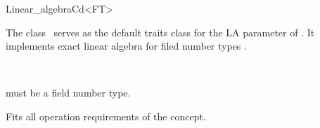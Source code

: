 \ccAutoIndexingOff
\begin{ccRefClass}{Linear_algebraCd<FT>}
\ccAutoIndexingOn
{}

\ccDefinition

The class \ccRefName\ serves as the default traits class for the LA
parameter of .  It implements exact
linear algebra for filed number types .


\ccIsModel

%
 \\

\ccCreation
{}  %


 must be a field number type.

\ccOperations

Fits all operation requirements of the concept.

\ccIndexTraitsClassEnd
\ccAutoIndexingOff
\end{ccRefClass}
\ccAutoIndexingOn     